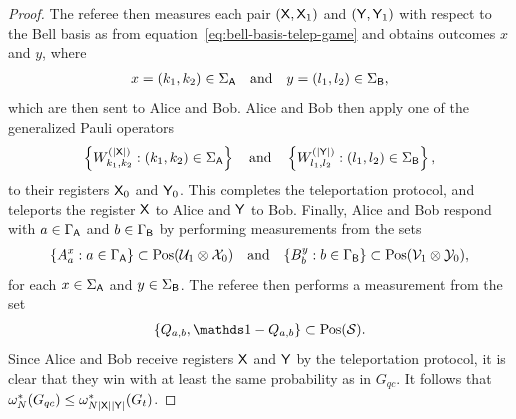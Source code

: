 \begin{proof}
The referee then measures each pair $(\mathsf{X},\mathsf{X}_1)$ and $(\mathsf{Y},\mathsf{Y}_1)$ with respect to the Bell basis as from equation~\eqref{eq:bell-basis-telep-game} and obtains outcomes $x$ and $y$, where
\begin{align}
	x = (k_1,k_2) \in \Sigma_{\mathsf{A}} \quad \textnormal{and} \quad y = (l_1,l_2) \in \Sigma_{\mathsf{B}},
\end{align}
which are then sent to Alice and Bob. 
Alice and Bob then apply one of the generalized Pauli operators 
\begin{align} \label{eq:gen-pauli-telep}
	\left \{ W_{k_1,k_2}^{(\left\lvert \mathsf{X} \right\rvert)} : (k_1, k_2) \in \Sigma_{\mathsf{A}} \right \} \quad \textnormal{and} \quad \left \{ W_{l_1, l_2}^{(\left\lvert \mathsf{Y} \right\rvert)} : (l_1, l_2) \in \Sigma_{\mathsf{B}} \right \},
\end{align}
to their registers $\mathsf{X}_0$ and $\mathsf{Y}_0$. This completes the teleportation protocol, and teleports the register $\mathsf{X}$ to Alice and $\mathsf{Y}$ to Bob. Finally, Alice and Bob respond with $a \in \Gamma_{\mathsf{A}}$ and $b \in \Gamma_{\mathsf{B}}$ by performing measurements from the sets 
\begin{align}
	\{ A_a^x : a \in \Gamma_{\mathsf{A}} \} \subset \mathrm{Pos}(\mathcal{U}_1 \otimes \mathcal{X}_0) \quad \textnormal{and} \quad \{B_b^y : b \in \Gamma_{\mathsf{B}} \} \subset \mathrm{Pos}(\mathcal{V}_1 \otimes \mathcal{Y}_0), 
\end{align}
for each $x \in \Sigma_{\mathsf{A}}$ and $y \in \Sigma_{\mathsf{B}}$. The referee then performs a measurement from the set 
\begin{align}
	\{Q_{a,b}, \I - Q_{a,b} \} \subset \Pos(\S). 
\end{align}
Since Alice and Bob receive registers $\mathsf{X}$ and $\mathsf{Y}$ by the teleportation protocol, it is clear that they win with at least the same probability as in $G_{qc}$. It follows that $\omega_N^*(G_{qc}) \leq \omega_{N\left\lvert \mathsf{X} \right\rvert\left\lvert \mathsf{Y} \right\rvert}^*(G_t)$. 


\end{proof}
